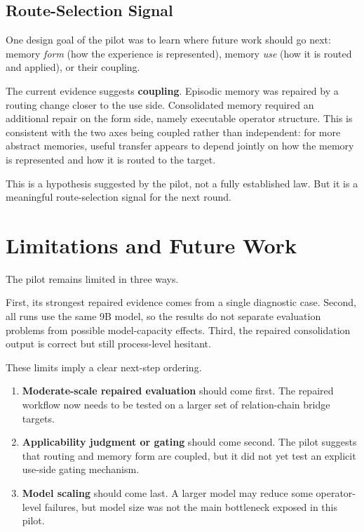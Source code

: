 \documentclass[11pt]{article}
\begin{document}
\subsection{Route-Selection Signal}

One design goal of the pilot was to learn where future work should go next: memory \emph{form} (how the experience is represented), memory \emph{use} (how it is routed and applied), or their coupling.

The current evidence suggests \textbf{coupling}. Episodic memory was repaired by a routing change closer to the use side. Consolidated memory required an additional repair on the form side, namely executable operator structure. This is consistent with the two axes being coupled rather than independent: for more abstract memories, useful transfer appears to depend jointly on how the memory is represented and how it is routed to the target.

This is a hypothesis suggested by the pilot, not a fully established law. But it is a meaningful route-selection signal for the next round.

\section{Limitations and Future Work}

The pilot remains limited in three ways.

First, its strongest repaired evidence comes from a single diagnostic case. Second, all runs use the same 9B model, so the results do not separate evaluation problems from possible model-capacity effects. Third, the repaired consolidation output is correct but still process-level hesitant.

These limits imply a clear next-step ordering.

\begin{enumerate}
\item \textbf{Moderate-scale repaired evaluation} should come first. The repaired workflow now needs to be tested on a larger set of relation-chain bridge targets.
\item \textbf{Applicability judgment or gating} should come second. The pilot suggests that routing and memory form are coupled, but it did not yet test an explicit use-side gating mechanism.
\item \textbf{Model scaling} should come last. A larger model may reduce some operator-level failures, but model size was not the main bottleneck exposed in this pilot.
\end{enumerate}
\end{document}
